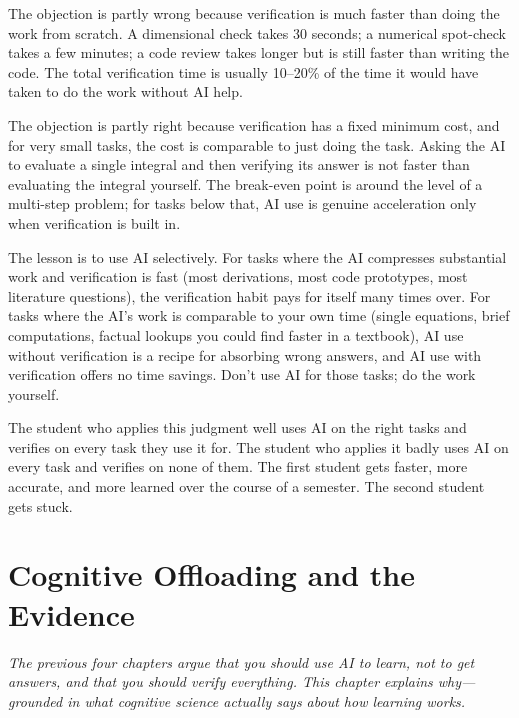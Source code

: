 \documentclass[11pt]{book}
\begin{document}
The objection is partly wrong because verification is much faster than doing the work from scratch. A dimensional check takes 30 seconds; a numerical spot-check takes a few minutes; a code review takes longer but is still faster than writing the code. The total verification time is usually 10--20\% of the time it would have taken to do the work without AI help.

The objection is partly right because verification has a fixed minimum cost, and for very small tasks, the cost is comparable to just doing the task. Asking the AI to evaluate a single integral and then verifying its answer is not faster than evaluating the integral yourself. The break-even point is around the level of a multi-step problem; for tasks below that, AI use is genuine acceleration only when verification is built in.

The lesson is to use AI selectively. For tasks where the AI compresses substantial work and verification is fast (most derivations, most code prototypes, most literature questions), the verification habit pays for itself many times over. For tasks where the AI's work is comparable to your own time (single equations, brief computations, factual lookups you could find faster in a textbook), AI use without verification is a recipe for absorbing wrong answers, and AI use with verification offers no time savings. Don't use AI for those tasks; do the work yourself.

The student who applies this judgment well uses AI on the right tasks and verifies on every task they use it for. The student who applies it badly uses AI on every task and verifies on none of them. The first student gets faster, more accurate, and more learned over the course of a semester. The second student gets stuck.

\chapter{Cognitive Offloading and the Evidence}
\label{ch:cognitive-offloading}

\noindent \emph{The previous four chapters argue that you should use AI to learn, not to get answers, and that you should verify everything. This chapter explains why---grounded in what cognitive science actually says about how learning works.}

\medskip
\end{document}
